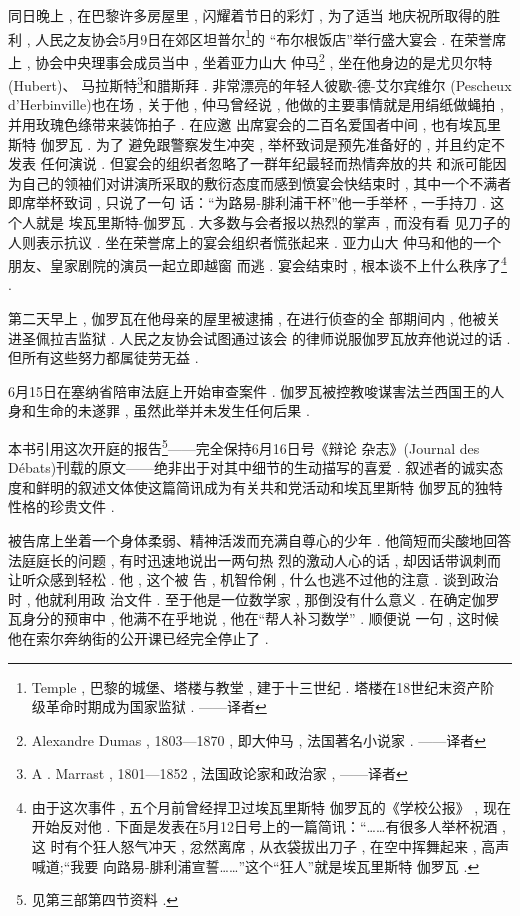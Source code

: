同日晚上 , 在巴黎许多房屋里 , 闪耀着节日的彩灯 , 为了适当 地庆祝所取得的胜利 , 人民之友协会5月9日在郊区坦普尔\footnote{Temple , 巴黎的城堡、塔楼与教堂 , 建于十三世纪 . 塔楼在18世纪末资产阶 级革命时期成为国家监狱 . ——译者}的 “布尔根饭店”举行盛大宴会 . 在荣誉席上 , 协会中央理事会成员当中 , 坐着亚力山大 \textbullet 仲马\footnote{Alexandre Dumas ,  1803—1870 , 即大仲马 , 法国著名小说家 . ——译者} , 坐在他身边的是尤贝尔特(Hubert)、 马拉斯特\footnote{A . Marrast , 1801—1852 , 法国政论家和政治家 , ——译者}和腊斯拜 . 非常漂亮的年轻人彼歇-德-艾尔宾维尔 (Pescheux d'Herbinville)也在场 , 关于他 , 仲马曾经说 , 他做的主要事情就是用绢纸做蝇拍 , 并用玫瑰色绦带来装饰拍子 . 在应邀 出席宴会的二百名爱国者中间 , 也有埃瓦里斯特 \textbullet 伽罗瓦 . 为了 避免跟警察发生冲突 , 举杯致词是预先准备好的 , 并且约定不发表 任何演说 . 但宴会的组织者忽略了一群年纪最轻而热情奔放的共 和派可能因为自己的领袖们对讲演所采取的敷衍态度而感到愤宴会快结束时 , 其中一个不满者即席举杯致词 , 只说了一句 话：“为路易-腓利浦干杯”他一手举杯 , 一手持刀 . 这个人就是 埃瓦里斯特-伽罗瓦 . 大多数与会者报以热烈的掌声 , 而没有看 见刀子的人则表示抗议 . 坐在荣誉席上的宴会组织者慌张起来 .  亚力山大 \textbullet 仲马和他的一个朋友、皇家剧院的演员一起立即越窗 而逃 . 宴会结束时 , 根本谈不上什么秩序了\footnote{由于这次事件 , 五个月前曾经捍卫过埃瓦里斯特 \textbullet 伽罗瓦的《学校公报》 , 现在开始反对他 . 下面是发表在5月12日号上的一篇简讯：“……有很多人举杯祝酒 , 这 时有个狂人怒气冲天 , 忿然离席 , 从衣袋拔出刀子 , 在空中挥舞起来 , 高声喊道;“我要 向路易-腓利浦宣誓……”这个“狂人”就是埃瓦里斯特 \textbullet 伽罗瓦 . } . 

第二天早上 , 伽罗瓦在他母亲的屋里被逮捕 , 在进行侦查的全 部期间内 , 他被关进圣佩拉吉监狱 . 人民之友协会试图通过该会 的律师说服伽罗瓦放弃他说过的话 . 但所有这些努力都属徒劳无益 . 

6月15日在塞纳省陪审法庭上开始审查案件 . 伽罗瓦被控教唆谋害法兰西国王的人身和生命的未遂罪 , 虽然此举并未发生任何后果 . 

本书引用这次开庭的报告\footnote{见第三部第四节资料 . }——完全保持6月16日号《辩论 杂志》(Journal des Débats)刊载的原文——绝非出于对其中细节的生动描写的喜爱 . 叙述者的诚实态度和鲜明的叙述文体使这篇简讯成为有关共和党活动和埃瓦里斯特 \textbullet 伽罗瓦的独特性格的珍贵文件 . 

被告席上坐着一个身体柔弱、精神活泼而充满自尊心的少年 .  他简短而尖酸地回答法庭庭长的问题 , 有时迅速地说出一两句热 烈的激动人心的话 , 却因话带讽刺而让听众感到轻松 . 他 , 这个被 告 , 机智伶俐 , 什么也逃不过他的注意 . 谈到政治时 , 他就利用政 治文件 . 至于他是一位数学家 , 那倒没有什么意义 . 在确定伽罗 瓦身分的预审中 , 他满不在乎地说 , 他在“帮人补习数学” .  顺便说 一句 , 这时候他在索尔奔纳街的公开课已经完全停止了 . 

